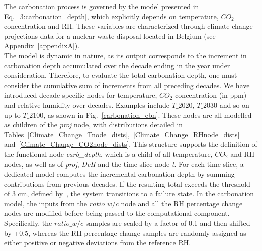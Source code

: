 The carbonation process is governed by the model presented in Eq.~\ref{3:carbonation_depth}, which explicitly depends on temperature, $CO_2$ concentration and RH. 
These variables are characterized through climate change projections data for a nuclear waste disposal located in Belgium (see Appendix~\ref{appendixA}). \\
The model is dynamic in nature, as its output corresponds to the increment in carbonation depth accumulated over the decade ending in the year under consideration. Therefore, to evaluate the total carbonation depth, one must consider the cumulative sum of increments from all preceding decades.
We have introduced decade-specific nodes for temperature, $CO_2$ concentration (in ppm) and relative humidity over decades.
Examples include $T\_ {2020}$, $T\_ {2030}$ and so on up to $T\_ {2100}$, as shown in Fig.~\ref{carbonation_ebn}. These nodes are all modelled as children of the \textit{proj} node, with distributions detailed in Tables~\ref{Climate_Change_Tnode_dists},~\ref{Climate_Change_RHnode_dists} and~\ref{Climate_Change_CO2node_dists}.
This structure supports the definition of the functional node \textit{carb\_depth}, which is a child of all temperature, $CO_2$ and RH nodes, as well as of \textit{proj}, \textit{DeH} and the time slice node \textit{t}. 
For each time slice, a dedicated model computes the incremental carbonation depth by summing contributions from previous decades. 
If the resulting total exceeds the threshold of 3 cm, defined by~\textcite{Carbonation_BASTIDASARTEAGA}, the system transitions to a failure state. 
In the carbonation model, the inputs from the $ratio\_w/c$ node and all the RH percentage change nodes are modified before being passed to the computational component. 
Specifically, the $ratio\_w/c$ samples are scaled by a factor of 0.1 and then shifted by +0.5, whereas the RH percentage change samples are randomly assigned as either positive or negative deviations from the reference RH.

